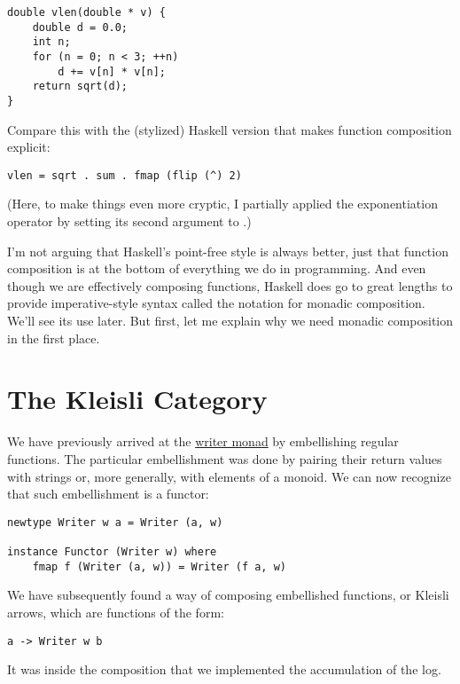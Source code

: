 \begin{Verbatim}
double vlen(double * v) {
    double d = 0.0;
    int n;
    for (n = 0; n < 3; ++n)
        d += v[n] * v[n];
    return sqrt(d);
}
\end{Verbatim}
Compare this with the (stylized) Haskell version that makes function
composition explicit:

\begin{Verbatim}[commandchars=\\\{\}]
vlen = sqrt . sum . fmap (flip (^) 2)
\end{Verbatim}
(Here, to make things even more cryptic, I partially applied the
exponentiation operator \code{(\^{})} by setting its second argument
to .)

I'm not arguing that Haskell's point-free style is always better, just
that function composition is at the bottom of everything we do in
programming. And even though we are effectively composing functions,
Haskell does go to great lengths to provide imperative-style syntax
called the  notation for monadic composition. We'll see its
use later. But first, let me explain why we need monadic composition in
the first place.

\section{The Kleisli Category}\label{the-kleisli-category}

We have previously arrived at the
\hyperref[kleisli-categories]{writer
monad} by embellishing regular functions. The particular embellishment
was done by pairing their return values with strings or, more generally,
with elements of a monoid. We can now recognize that such embellishment
is a functor:

\begin{Verbatim}[commandchars=\\\{\}]
newtype Writer w a = Writer (a, w)

instance Functor (Writer w) where
    fmap f (Writer (a, w)) = Writer (f a, w)
\end{Verbatim}
We have subsequently found a way of composing embellished functions, or
Kleisli arrows, which are functions of the form:

\begin{Verbatim}[commandchars=\\\{\}]
a -> Writer w b
\end{Verbatim}

It was inside the composition that we implemented the accumulation of
the log.

